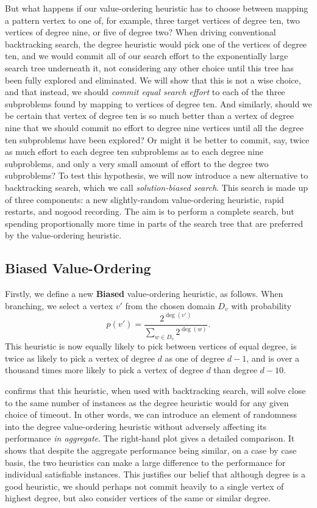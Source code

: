 \documentclass[runningheads]{llncs}
\begin{document}
But what happens if our value-ordering heuristic has to choose between mapping a pattern vertex to
one of, for example, three target vertices of degree ten, two vertices of degree nine, or five of
degree two? When driving conventional backtracking search, the degree heuristic would pick one of
the vertices of degree ten, and we would commit all of our search effort to the exponentially large
search tree underneath it, not considering any other choice until this tree has been fully explored
and eliminated.  We will show that this is not a wise choice, and that instead, we should
\emph{commit equal search effort} to each of the three subproblems found by mapping to vertices of
degree ten.  And similarly, should we be certain that vertex of degree ten is so much better than a
vertex of degree nine that we should commit no effort to degree nine vertices until all the degree
ten subproblems have been explored? Or might it be better to commit, say, twice as much effort to
each degree ten subproblems as to each degree nine subproblems, and only a very small amount of
effort to the degree two subproblems?  To test this hypothesis, we will now introduce a new
alternative to backtracking search, which we call \emph{solution-biased search}.  This search is
made up of three components: a new slightly-random value-ordering heuristic, rapid restarts, and
nogood recording. The aim is to perform a complete search, but spending proportionally more time in
parts of the search tree that are preferred by the value-ordering heuristic.

\subsection{Biased Value-Ordering}

Firstly, we define a new \textbf{Biased} value-ordering heuristic, as follows. When branching, we
select a vertex $v'$ from the chosen domain $D_v$ with probability \[ p(v') =
\frac{2^{\deg(v')}}{\sum_{w \in D_v}{2^{\deg(w)}}} \text{.} \] This heuristic is now equally likely
to pick between vertices of equal degree, is twice as likely to pick a vertex of degree $d$ as one
of degree $d - 1$, and is over a thousand times more likely to pick a vertex of degree $d$ than
degree $d - 10$.

 confirms that this heuristic, when used with backtracking
search, will solve close to the same number of instances as the degree heuristic would for any given
choice of timeout. In other words, we can introduce an element of randomness into the degree
value-ordering heuristic without adversely affecting its performance \emph{in aggregate}.  The
right-hand plot gives a detailed comparison. It shows that despite the aggregate performance being
similar, on a case by case basis, the two heuristics can make a large difference to the performance
for individual satisfiable instances. This justifies our belief that although degree is a good
heuristic, we should perhaps not commit heavily to a single vertex of highest degree, but also consider
vertices of the same or similar degree.
\end{document}
